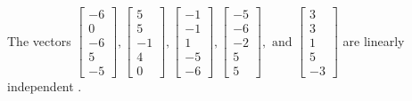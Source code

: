\begin{exercise}
\begin{exerciseStatement}
  \end{exerciseStatement}
  \begin{exerciseAnswer}
   The vectors \(\left[\begin{array}{r}
-6 \\
0 \\
-6 \\
5 \\
-5
\end{array}\right] , \left[\begin{array}{r}
5 \\
5 \\
-1 \\
4 \\
0
\end{array}\right] , \left[\begin{array}{r}
-1 \\
-1 \\
1 \\
-5 \\
-6
\end{array}\right] , \left[\begin{array}{r}
-5 \\
-6 \\
-2 \\
5 \\
5
\end{array}\right] , \text{ and } \left[\begin{array}{r}
3 \\
3 \\
1 \\
5 \\
-3
\end{array}\right]\) are 
  	 linearly independent  .
  


  \end{exerciseAnswer}
\end{exercise}